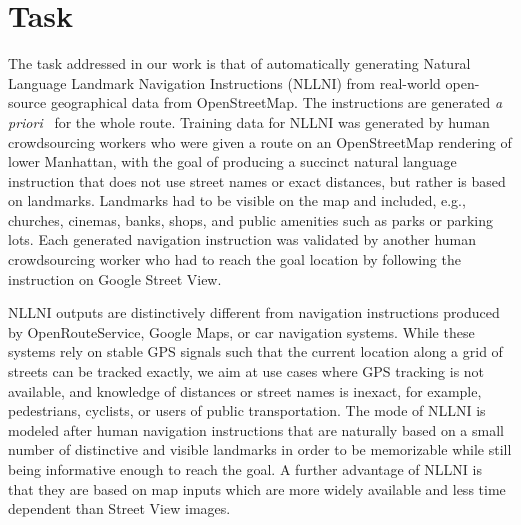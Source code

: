 \documentclass[11pt,a4paper]{article}
\begin{document}
\begin{table*}[ht!]
\label{tab:datasets}
\end{table*} \section{Task}

The task addressed in our work is that of automatically generating Natural Language Landmark Navigation Instructions (NLLNI) from real-world open-source geographical data from OpenStreetMap. The instructions are generated \textit{a priori}~\citep{janarthanam-etal-2012-web} for the whole route. Training data for NLLNI was generated by human crowdsourcing workers who were given a route on an OpenStreetMap rendering of lower Manhattan, with the goal of producing a succinct natural language instruction that does not use street names or exact distances, but rather is based on landmarks. Landmarks had to be visible on the map and included, e.g., churches, cinemas, banks, shops, and public amenities such as parks or parking lots. Each generated navigation instruction was validated by another human crowdsourcing worker who had to reach the goal location by following the instruction on Google Street View. 

NLLNI outputs are distinctively different from navigation instructions produced by OpenRouteService, Google Maps, or car navigation systems. While these systems rely on stable GPS signals such that the current location along a grid of streets can be tracked exactly, we aim at use cases where GPS tracking is not available, and knowledge of distances or street names is inexact, for example, pedestrians, cyclists, or users of public transportation. The mode of NLLNI is modeled after human navigation instructions that are naturally based on a small number of distinctive and visible landmarks in order to be memorizable while still being informative enough to reach the goal.  
A further advantage of NLLNI is that they are based on map inputs which are more widely available and less time dependent than Street View images.
\end{document}
